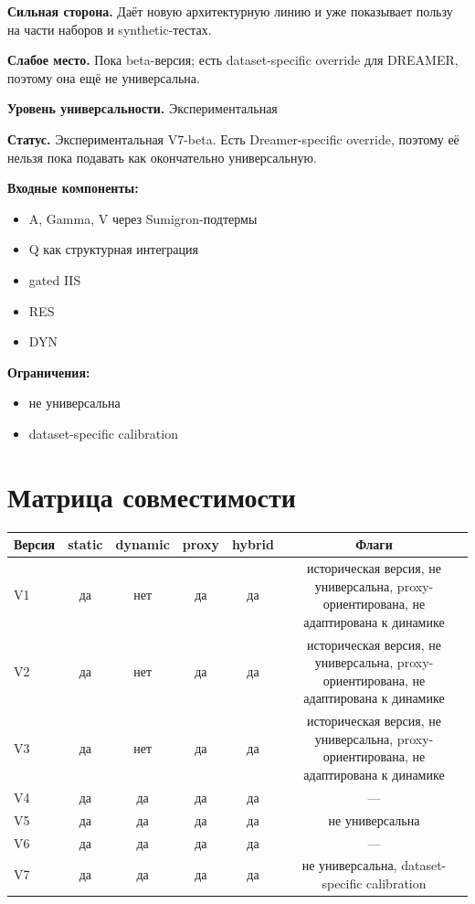 \documentclass[11pt,a4paper]{article}
\begin{document}
\textbf{Сильная сторона.} Даёт новую архитектурную линию и уже показывает пользу на части наборов и synthetic-тестах.

\textbf{Слабое место.} Пока beta-версия; есть dataset-specific override для DREAMER, поэтому она ещё не универсальна.

\textbf{Уровень универсальности.} Экспериментальная

\textbf{Статус.} Экспериментальная V7-beta. Есть Dreamer-specific override, поэтому её нельзя пока подавать как окончательно универсальную.

\textbf{Входные компоненты:}
\begin{itemize}[leftmargin=1.2cm]
\item A, Gamma, V через Sumigron-подтермы
\item Q как структурная интеграция
\item gated IIS
\item RES
\item DYN
\end{itemize}

\textbf{Ограничения:}
\begin{itemize}[leftmargin=1.2cm]
\item не универсальна
\item dataset-specific calibration
\end{itemize}


\section{Матрица совместимости}
\begin{center}
\begin{tabular}{lccccc}
\toprule
Версия & static & dynamic & proxy & hybrid & Флаги \\
\midrule
V1 & да & нет & да & да & историческая версия, не универсальна, proxy-ориентирована, не адаптирована к динамике \\
V2 & да & нет & да & да & историческая версия, не универсальна, proxy-ориентирована, не адаптирована к динамике \\
V3 & да & нет & да & да & историческая версия, не универсальна, proxy-ориентирована, не адаптирована к динамике \\
V4 & да & да & да & да & --- \\
V5 & да & да & да & да & не универсальна \\
V6 & да & да & да & да & --- \\
V7 & да & да & да & да & не универсальна, dataset-specific calibration \\
\bottomrule
\end{tabular}
\end{center}
\end{document}
